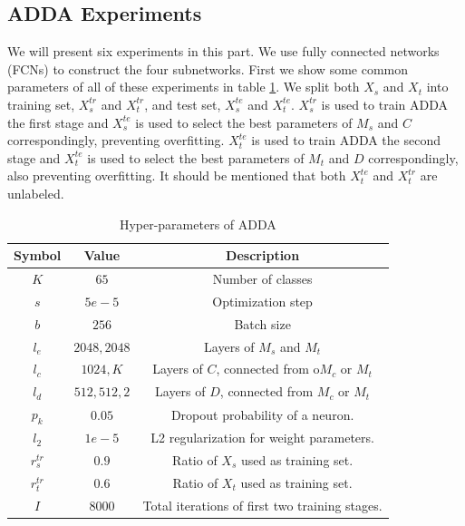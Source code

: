 \documentclass[conference]{IEEEtran}
\begin{document}
\subsection{ADDA Experiments}
We will present six experiments in this part. We use fully connected networks (FCNs) to construct the four subnetworks. First we show some common parameters of all of these experiments in table \ref{tab:SymADDA}. We split both $X_s$ and $X_t$ into training set, $X^{tr}_s$ and $X^{tr}_t$, and test set, $X^{te}_s$ and $X^{te}_t$. $X^{tr}_s$ is used to train ADDA the first stage and $X^{te}_s$ is used to select the best parameters of $M_s$ and $C$ correspondingly, preventing overfitting. $X^{te}_t$ is used to train ADDA the second stage and $X^{te}_t$ is used to select the best parameters of $M_t$ and $D$ correspondingly, also preventing overfitting. It should be mentioned that both $X^{te}_t$ and $X^{tr}_t$ are unlabeled.
 \begin{table}[h]
	\centering
	\caption{Hyper-parameters of ADDA}
	\label{tab:SymADDA}
	\begin{tabular}{ccc}
		\hline
		Symbol & Value & Description \\
		\hline
		\hline
        $K$ & $65$ & Number of classes \\
		$s$ & $5e-5$ & Optimization step \\
		$b$ & $256$ & Batch size \\
		$l_e$ & ${2048,2048}$ & Layers of $M_s$ and $M_t$ \\
		$l_c$ & ${1024,K}$ & Layers of $C$, connected from o$M_c$ or $M_t$  \\
		$l_d$ & ${512,512,2}$ & Layers of $D$, connected from $M_c$ or $M_t$ \\
        $p_k$ & $0.05$ & Dropout probability of a neuron. \\
        $l_2$ & $1e-5$ & L2 regularization for weight parameters.  \\
        $r^{tr}_{s}$ & $0.9$ & Ratio of $X_s$ used as training set.\\
        $r^{tr}_{t}$ & $0.6$ & Ratio of $X_t$ used as training set.  \\
        $I$ & $8000$ & Total iterations of first two training stages.   \\
		\hline
	\end{tabular}
\end{table}
\end{document}
